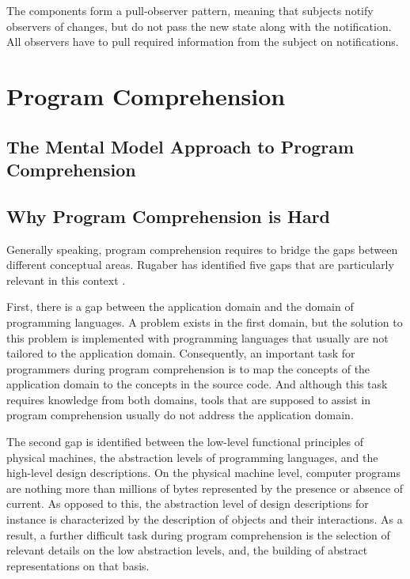 The components form a pull-observer pattern, meaning that subjects notify observers of changes, but do not pass the new state along with the notification.
All observers have to pull required information from the subject on notifications.

\section{Program Comprehension}

\subsection{The Mental Model Approach to Program Comprehension}

\subsection{Why Program Comprehension is Hard}
Generally speaking, program comprehension requires to bridge the gaps between different conceptual areas.
Rugaber has identified five gaps that are particularly relevant in this context \cite{kent_program_1996}.

First, there is a gap between the application domain and the domain of programming languages.
A problem exists in the first domain, but the solution to this problem is implemented with programming languages that usually are not tailored to the application domain.
Consequently, an important task for programmers during program comprehension is to map the concepts of the application domain to the concepts in the source code.
And although this task requires knowledge from both domains, tools that are supposed to assist in program comprehension usually do not address the application domain.

The second gap is identified between the low-level functional principles of physical machines, the abstraction levels of programming languages, and the high-level design descriptions.
On the physical machine level, computer programs are nothing more than millions of bytes represented by the presence or absence of current.
As opposed to this, the abstraction level of design descriptions for instance is characterized by the description of objects and their interactions.
As a result, a further difficult task during program comprehension is the selection of relevant details on the low abstraction levels, and, the building of abstract representations on that basis.

